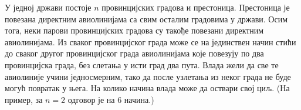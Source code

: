 У једној држави постоје $n$ провинцијских градова и престоница.
Престоница је повезана директним авиолинијама са свим осталим градовима у
држави.
Осим тога, неки парови провинцијских градова су такође повезани директним
авиолинијама.
Из сваког провинцијског града може се на јединствен начин стићи до сваког
другог провинцијског града авиолинијама које повезују по два провинцијска
града, без слетања у исти град два пута.
Влада жели да све те авиолиније учини једносмерним, тако да после узлетања из
неког града не буде могућ повратак у њега.
На колико начина влада може да оствари свој циљ.
(На пример, за $n = 2$ одговор је на $6$ начина.)

\solution


